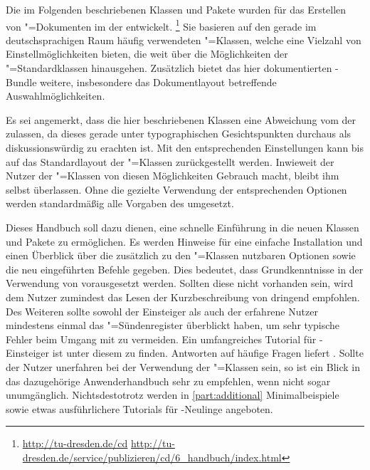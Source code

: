 \addchap{\prefacename}
Die im Folgenden beschriebenen Klassen und Pakete wurden für das Erstellen von 
"=Dokumenten im \CD der \TnUD entwickelt.%
\footnote{%
  \url{http://tu-dresden.de/cd}\hfill
  \url{http://tu-dresden.de/service/publizieren/cd/6_handbuch/index.html}%
}
Sie basieren auf den gerade im deutschsprachigen Raum häufig verwendeten 
\KOMAScript"=Klassen, welche eine Vielzahl von Einstellmöglichkeiten bieten, 
die weit über die Möglichkeiten der "=Standardklassen 
hinausgehen. Zusätzlich bietet das hier dokumentierten \TUDScript-Bundle 
weitere, insbesondere das Dokumentlayout betreffende Auswahlmöglichkeiten.

Es sei angemerkt, dass die hier beschriebenen Klassen eine Abweichung vom \CD 
der \TnUD zulassen, da dieses gerade unter typographischen Gesichtspunkten 
durchaus als diskussionswürdig zu erachten ist. Mit den entsprechenden 
Einstellungen kann bis auf das Standardlayout der \KOMAScript"=Klassen 
zurückgestellt werden. Inwieweit der Nutzer der \TUDScript"=Klassen von diesen 
Möglichkeiten Gebrauch macht, bleibt ihm selbst überlassen. Ohne die gezielte 
Verwendung der entsprechenden Optionen werden standardmäßig alle Vorgaben des 
\CDs umgesetzt.

Dieses Handbuch soll dazu dienen, eine schnelle Einführung in die neuen Klassen
und Pakete zu ermöglichen. Es werden Hinweise für eine einfache Installation 
und einen Überblick über die zusätzlich zu den \KOMAScript"=Klassen nutzbaren 
Optionen sowie die neu eingeführten Befehle gegeben. Dies bedeutet, dass 
Grundkenntnisse in der Verwendung von  vorausgesetzt werden. 
Sollten diese nicht vorhanden sein, wird dem Nutzer zumindest das Lesen der 
Kurzbeschreibung von 
dringend empfohlen. Des Weiteren sollte sowohl der Einsteiger als auch der 
erfahrene Nutzer mindestens einmal das "=Sündenregister
überblickt haben, um sehr typische Fehler beim Umgang mit  zu 
vermeiden. Ein umfangreiches Tutorial für -Einsteiger ist unter 
diesem  zu finden. 
Antworten auf häufige Fragen liefert
. Sollte der Nutzer 
unerfahren bei der Verwendung der \KOMAScript"=Klassen sein, so ist ein Blick 
in das dazugehörige Anwenderhandbuch
{} sehr zu empfehlen, wenn nicht sogar unumgänglich.
Nichtsdestotrotz werden in \autoref{part:additional} Minimalbeispiele sowie 
etwas ausführlichere Tutorials für -Neulinge angeboten. 

